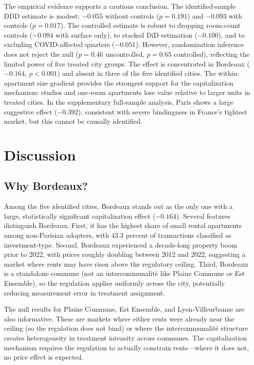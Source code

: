 \documentclass[12pt]{article}
\begin{document}
The empirical evidence supports a cautious conclusion. The identified-sample DDD estimate is modest: $-0.055$ without controls ($p = 0.191$) and $-0.093$ with controls ($p = 0.017$). The controlled estimate is robust to dropping room-count controls ($-0.094$ with surface only), to stacked DiD estimation ($-0.100$), and to excluding COVID-affected quarters ($-0.051$). However, randomization inference does not reject the null ($p = 0.46$ uncontrolled, $p = 0.65$ controlled), reflecting the limited power of five treated city groups. The effect is concentrated in Bordeaux ($-0.164$, $p < 0.001$) and absent in three of the five identified cities. The within-apartment size gradient provides the strongest support for the capitalization mechanism: studios and one-room apartments lose value relative to larger units in treated cities. In the supplementary full-sample analysis, Paris shows a large suggestive effect ($-0.392$), consistent with severe bindingness in France's tightest market, but this cannot be causally identified.


\section{Discussion}

\subsection{Why Bordeaux?}

Among the five identified cities, Bordeaux stands out as the only one with a large, statistically significant capitalization effect ($-0.164$). Several features distinguish Bordeaux. First, it has the highest share of small rental apartments among non-Parisian adopters, with 43.3 percent of transactions classified as investment-type. Second, Bordeaux experienced a decade-long property boom prior to 2022, with prices roughly doubling between 2012 and 2022, suggesting a market where rents may have risen above the regulatory ceiling. Third, Bordeaux is a standalone commune (not an intercommunalit\'e like Plaine Commune or Est Ensemble), so the regulation applies uniformly across the city, potentially reducing measurement error in treatment assignment.

The null results for Plaine Commune, Est Ensemble, and Lyon-Villeurbanne are also informative. These are markets where either rents were already near the ceiling (so the regulation does not bind) or where the intercommunalit\'e structure creates heterogeneity in treatment intensity across communes. The capitalization mechanism requires the regulation to actually constrain rents---where it does not, no price effect is expected.
\end{document}
